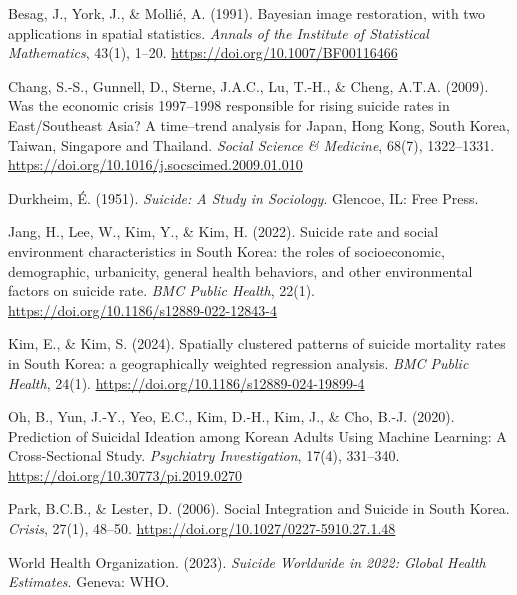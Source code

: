 \documentclass[11pt]{article}
\begin{document}
	\newpage
	\begin{flushleft}
		\begin{thebibliography}{9}
			
			Besag, J., York, J., \& Mollié, A. (1991). Bayesian image restoration, with two applications in spatial statistics. \textit{Annals of the Institute of Statistical Mathematics}, 43(1), 1--20. \url{https://doi.org/10.1007/BF00116466}
			
			Chang, S.-S., Gunnell, D., Sterne, J.A.C., Lu, T.-H., \& Cheng, A.T.A. (2009). Was the economic crisis 1997–1998 responsible for rising suicide rates in East/Southeast Asia? A time–trend analysis for Japan, Hong Kong, South Korea, Taiwan, Singapore and Thailand. \textit{Social Science \& Medicine}, 68(7), 1322–1331. \url{https://doi.org/10.1016/j.socscimed.2009.01.010}
			
			Durkheim, É. (1951). \textit{Suicide: A Study in Sociology}. Glencoe, IL: Free Press.
			
			Jang, H., Lee, W., Kim, Y., \& Kim, H. (2022). Suicide rate and social environment characteristics in South Korea: the roles of socioeconomic, demographic, urbanicity, general health behaviors, and other environmental factors on suicide rate. \textit{BMC Public Health}, 22(1). \url{https://doi.org/10.1186/s12889-022-12843-4}
			
			Kim, E., \& Kim, S. (2024). Spatially clustered patterns of suicide mortality rates in South Korea: a geographically weighted regression analysis. \textit{BMC Public Health}, 24(1). \url{https://doi.org/10.1186/s12889-024-19899-4}
			
			Oh, B., Yun, J.-Y., Yeo, E.C., Kim, D.-H., Kim, J., \& Cho, B.-J. (2020). Prediction of Suicidal Ideation among Korean Adults Using Machine Learning: A Cross-Sectional Study. \textit{Psychiatry Investigation}, 17(4), 331–340. \url{https://doi.org/10.30773/pi.2019.0270}
			
			Park, B.C.B., \& Lester, D. (2006). Social Integration and Suicide in South Korea. \textit{Crisis}, 27(1), 48–50. \url{https://doi.org/10.1027/0227-5910.27.1.48}
			
			World Health Organization. (2023). \textit{Suicide Worldwide in 2022: Global Health Estimates}. Geneva: WHO.
			
		\end{thebibliography}
	\end{flushleft}
	
\end{document}
